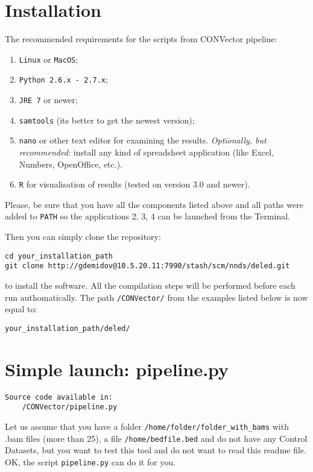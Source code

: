 \documentclass{article}
\begin{document}
\section{Installation}


The recommended requirements for the scripts from CONVector pipeline:
\begin{enumerate}
    \item \texttt{Linux} or \texttt{MacOS};
    \item \texttt{Python 2.6.x - 2.7.x};
    \item \texttt{JRE 7} or newer;
    \item \texttt{samtools} (its better to get the newest version);
    \item \texttt{nano} or other text editor for examining the results. {\it Optionally, but recommended:} install any kind of spreadsheet application (like Excel, Numbers, OpenOffice, etc.).
     \item \texttt{R} for visualisation of results (tested on version 3.0 and newer).
\end{enumerate}


Please, be sure that you have all the components listed above and all paths were added to \texttt{PATH} so the applications 2, 3, 4 can be launched from the Terminal.

Then you can simply clone the repository: 

\begin{lstlisting}[style=DOS, caption={Installation of the package}]
cd your_installation_path
git clone http://gdemidov@10.5.20.11:7990/stash/scm/nnds/deled.git
\end{lstlisting}
    
 to install the software. All the compilation steps will be performed before each run authomatically. The path \texttt{/CONVector/} from the examples listed below is now equal to:
 
 \texttt{your\_installation\_path/deled/}




\newpage
\section{Simple launch: pipeline.py}
\begin{verbatim}
Source code available in:
    /CONVector/pipeline.py
\end{verbatim}

Let us assume that you have a folder \texttt{/home/folder/folder\_with\_bams} with .bam files (more than 25), a file \texttt{/home/bedfile.bed} and do not have any Control Datasets, but you want to test this tool and do not want to read this readme file. OK, the script \texttt{pipeline.py} can do it for you.
\end{document}
